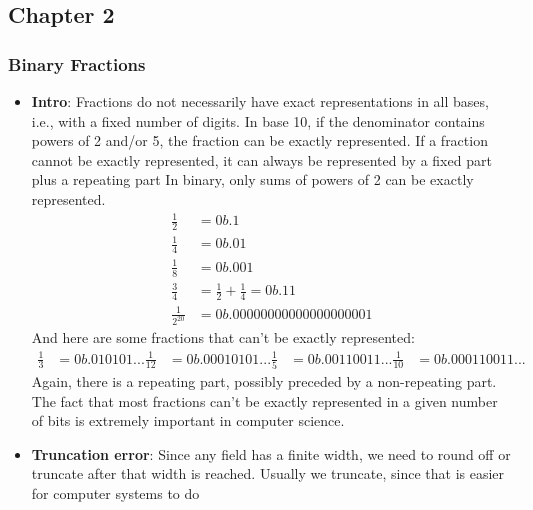 \documentclass{report}
\begin{document}
\begin{itemize}
    \end{itemize}
    
    \pagebreak 
    \subsection{Chapter 2}
    \bigbreak \noindent 
    \subsubsection{Binary Fractions}
    \begin{itemize}
        \item \textbf{Intro}: Fractions do not necessarily have exact representations in all bases, i.e., with a fixed number of digits.
            \bigbreak \noindent 
            In base 10, if the denominator contains powers of 2 and/or 5, the fraction can be exactly represented.
            \bigbreak \noindent 
            If a fraction cannot be exactly represented, it can always be represented by a fixed part plus a repeating part
            \bigbreak \noindent 
            In binary, only sums of powers of 2 can be exactly represented.
            \begin{align*}
                \frac{1}{2} &= 0b.1\\
                \frac{1}{4} &= 0b.01 \\
                \frac{1}{8} &= 0b.001 \\
                \frac{3}{4} &= \frac{1}{2} + \frac{1}{4} = 0b.11 \\
                \frac{1}{2^{20}} &= 0b.00000000000000000001
            \end{align*}
            And here are some fractions that can’t be exactly represented:
            \begin{align*}
                \frac{1}{3} &= 0b.010101...
                \frac{1}{12} &= 0b.00010101...
                \frac{1}{5} &= 0b.00110011...
                \frac{1}{10} &= 0b.000110011...
            \end{align*}
            Again, there is a repeating part, possibly preceded by a non-repeating part.
            \bigbreak \noindent 
            The fact that most fractions can’t be exactly represented in a given number of bits is extremely important in computer science.
        \item \textbf{Truncation error}:  Since any field has a finite width, we need to round off or truncate after that width is reached.
            \bigbreak \noindent 
            Usually we truncate, since that is easier for computer systems to do

\end{itemize}
\end{document}
